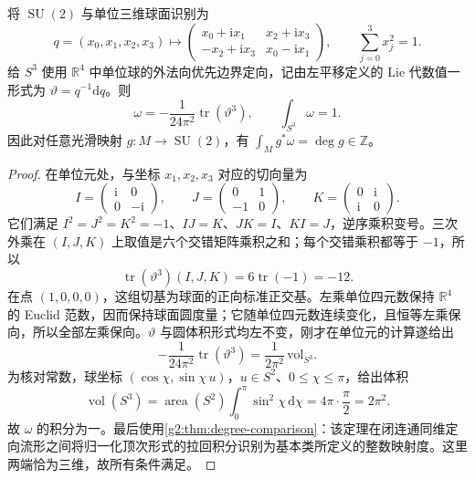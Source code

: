 \begin{lemma}\label{g2:lem:su-two-integral-three-form}
	将 \(\operatorname{SU}(2)\) 与单位三维球面识别为
	\[
		q=(x_0,x_1,x_2,x_3)\longmapsto
		\begin{pmatrix}x_0+\mathrm i x_1&x_2+\mathrm i x_3\\-x_2+\mathrm i x_3&x_0-\mathrm i x_1\end{pmatrix},
		\qquad\sum_{j=0}^3x_j^2=1.
	\]
	给 \(S^3\) 使用 \(\mathbb R^4\) 中单位球的外法向优先边界定向，记由左平移定义的 Lie 代数值一形式为 \(\vartheta=q^{-1}\mathrm dq\)。则
	\begin{equation}\label{g2:eq:su-two-normalized-volume}
		\omega=-\frac1{24\pi^2}\operatorname{tr}(\vartheta^3),\qquad \int_{S^3}\omega=1.
	\end{equation}
	因此对任意光滑映射 \(g:M\to\operatorname{SU}(2)\)，有 \(\int_Mg^*\omega=\deg g\in\mathbb Z\)。
\end{lemma}
\begin{proof}
	在单位元处，与坐标 \(x_1,x_2,x_3\) 对应的切向量为
	\[
		I=\begin{pmatrix}\mathrm i&0\\0&-\mathrm i\end{pmatrix},\qquad
		J=\begin{pmatrix}0&1\\-1&0\end{pmatrix},\qquad
		K=\begin{pmatrix}0&\mathrm i\\\mathrm i&0\end{pmatrix}.
	\]
	它们满足 \(I^2=J^2=K^2=-1\)、\(IJ=K\)、\(JK=I\)、\(KI=J\)，逆序乘积变号。三次外乘在 \((I,J,K)\) 上取值是六个交错矩阵乘积之和；每个交错乘积都等于 \(-1\)，所以
	\[
		\operatorname{tr}(\vartheta^3)(I,J,K)=6\operatorname{tr}(-1)=-12.
	\]
	在点 \((1,0,0,0)\)，这组切基为球面的正向标准正交基。左乘单位四元数保持 \(\mathbb R^4\) 的 Euclid 范数，因而保持球面圆度量；它随单位四元数连续变化，且恒等左乘保向，所以全部左乘保向。\(\vartheta\) 与圆体积形式均左不变，刚才在单位元的计算遂给出
	\[
		-\frac1{24\pi^2}\operatorname{tr}(\vartheta^3)=\frac1{2\pi^2}\,\mathrm{vol}_{S^3}.
	\]
	为核对常数，球坐标 \((\cos\chi,\sin\chi\,u)\)，\(u\in S^2\)、\(0\le\chi\le\pi\)，给出体积
	\[
		\operatorname{vol}(S^3)=\operatorname{area}(S^2)\int_0^\pi\sin^2\chi\,\mathrm d\chi=4\pi\cdot\frac\pi2=2\pi^2.
	\]
	故 \(\omega\) 的积分为一。最后使用\cref{g2:thm:degree-comparison}：该定理在闭连通同维定向流形之间将归一化顶次形式的拉回积分识别为基本类所定义的整数映射度。这里两端恰为三维，故所有条件满足。
\end{proof}

